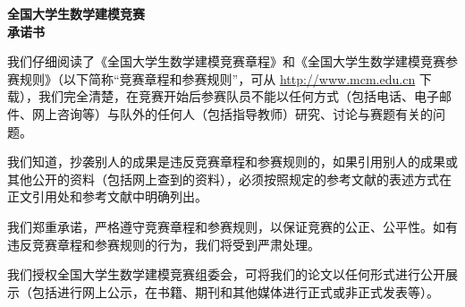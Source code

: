 \documentclass[12pt,a4paper]{ctexart}
\newcommand{\teamplaceholder}[1]{\underline{\hspace{2.5cm}\makebox[0pt][c]{\small #1}\hspace{2.5cm}}}
\newcommand{\teamfield}[2]{%
  \par\noindent #1\par\nobreak\vspace{2pt}%
  \noindent\teamplaceholder{#2}\par\vspace{6pt}}
\begin{document}
\thispagestyle{empty}                 %

\begin{center}
  {\bfseries 全国大学生数学建模竞赛}\\[10pt]
  {\bfseries 承\quad 诺\quad 书}
\end{center}

\vspace{10pt}

\begingroup
\linespread{1.35}\selectfont
{}

我们仔细阅读了《全国大学生数学建模竞赛章程》和《全国大学生数学建模竞赛参赛规则》（以下简称“竞赛章程和参赛规则”，可从 \url{http://www.mcm.edu.cn} 下载），我们完全清楚，在竞赛开始后参赛队员不能以任何方式（包括电话、电子邮件、网上咨询等）与队外的任何人（包括指导教师）研究、讨论与赛题有关的问题。

我们知道，抄袭别人的成果是违反竞赛章程和参赛规则的，如果引用别人的成果或其他公开的资料（包括网上查到的资料），必须按照规定的参考文献的表述方式在正文引用处和参考文献中明确列出。

我们郑重承诺，严格遵守竞赛章程和参赛规则，以保证竞赛的公正、公平性。如有违反竞赛章程和参赛规则的行为，我们将受到严肃处理。

我们授权全国大学生数学建模竞赛组委会，可将我们的论文以任何形式进行公开展示（包括进行网上公示，在书籍、期刊和其他媒体进行正式或非正式发表等）。
\end{document}
